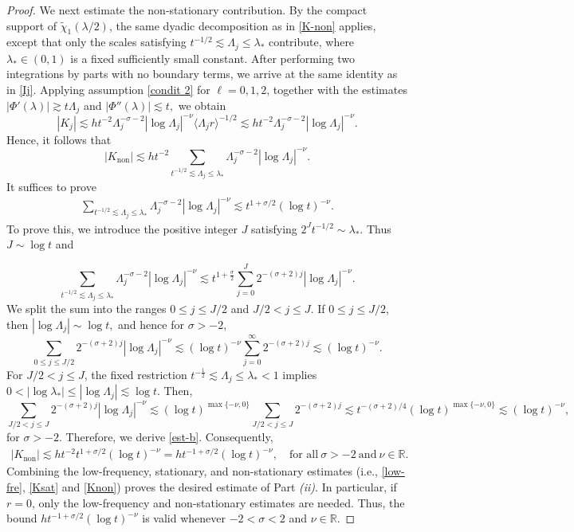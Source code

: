\documentclass[reqno]{amsart}
\numberwithin{equation}{section}
\begin{document}
\begin{proof}
	We next estimate the non-stationary contribution. By the compact
	support of $\widetilde{\chi}_1(\lambda/2)$, the same dyadic
	decomposition as in \eqref{K-non} applies, except that only the scales
	satisfying
	$
	t^{-1/2}
	\lesssim
	\Lambda_j
	\leq
	\lambda_*
	$
	contribute, where $\lambda_*\in(0,1)$ is a fixed sufficiently small
	constant. 	After performing two integrations by parts with no boundary terms, we arrive at the same identity as in \eqref{Ij}. Applying assumption \eqref{condit 2} for \(\ell=0,1,2\), together with the estimates
	$
	|\Phi'(\lambda)| \gtrsim t\Lambda_j
	$ and
	$|\Phi''(\lambda)| \lesssim t,
	$
	we obtain
	$$
	|K_j|
	\lesssim
	h t^{-2}
	\Lambda_j^{-\sigma-2}
	|\log\Lambda_j|^{-\nu}
	\langle\Lambda_j r\rangle^{-1/2}\lesssim
	h t^{-2}
	\Lambda_j^{-\sigma-2}
	|\log\Lambda_j|^{-\nu}.
	$$
	Hence,  it follows that
	$$
	|K_{\mathrm{non}}|
	\lesssim
	h t^{-2}
	\sum_{t^{-1/2}\lesssim\Lambda_j\le \lambda_*}
	\Lambda_j^{-\sigma-2}
	|\log\Lambda_j|^{-\nu}.
	$$
It suffices to prove 
	\begin{align}\label{est-b}
	\sum_{t^{-1/2}\lesssim\Lambda_j\le \lambda_*}
	\Lambda_j^{-\sigma-2}
	|\log\Lambda_j|^{-\nu}
	\lesssim
	t^{1+\sigma/2}
	(\log t)^{-\nu}.
	\end{align}
	To prove this, we introduce the positive integer $J$ satisfying
	 $
	2^Jt^{-1/2}\sim\lambda_*.
	$
	Thus
	$
	J\sim\log t
	$ and 

	$$
	\sum_{t^{-1/2}\lesssim\Lambda_j\le \lambda_*}
\Lambda_j^{-\sigma-2}
|\log\Lambda_j|^{-\nu}\lesssim	t^{1+\frac{\sigma}{2}}
	\sum_{j=0}^{J}
	2^{-(\sigma+2)j}
	\left|
	\log\Lambda_j
	\right|^{-\nu}.
	$$
	We split the sum into the ranges $0\leq j\leq J/2$ and
	$J/2<j\leq J$. If $0\leq j\leq J/2$, then
	$
	\left|
	\log\Lambda_j
	\right|
	\sim
	\log t,
	$
	and hence for $\sigma>-2$,
	$$
	\sum_{0\leq j\leq J/2}
	2^{-(\sigma+2)j}
	\left|
	\log\Lambda_j
	\right|^{-\nu}
	\lesssim
	(\log t)^{-\nu}
	\sum_{j=0}^\infty2^{-(\sigma+2)j}
	\lesssim
	(\log t)^{-\nu}.
	$$
	For $J/2<j\leq J$, the fixed restriction
	$
t^{-\frac{1}{2}}	\lesssim\Lambda_j\leq\lambda_*<1
	$
	implies
	$
0<	|\log\lambda_*|\leq	|\log\Lambda_j|
\lesssim\log t
.
	$
Then, 
	$$
	\sum_{J/2<j\leq J}
	2^{-(\sigma+2)j}
	\left|\log
\Lambda_j
	\right|^{-\nu}\lesssim
	(\log t)^{\max\{-\nu,0\}}\sum_{J/2<j\leq J}
	2^{-(\sigma+2)j}
	\lesssim
	t^{-(\sigma+2)/4}
	(\log t)^{\max\{-\nu,0\}}	\lesssim
	(\log t)^{-\nu},
	$$
	for $\sigma>-2$. Therefore,
	we derive \eqref{est-b}.
	Consequently,
	\begin{align}\label{Knon}
	|K_{\mathrm{non}}|
	\lesssim
	h t^{-2}
	t^{1+\sigma/2}
	(\log t)^{-\nu}
	=
	h t^{-1+\sigma/2}
	(\log t)^{-\nu},\quad \text{for all}\ \sigma>-2 \ \text{and}\ \nu\in\mathbb{R}.
	\end{align}
	Combining the low-frequency, stationary, and non-stationary estimates (i.e., \eqref{low-fre}, \eqref{Ksat} and \eqref{Knon})
	proves the desired  estimate  of Part \emph{(ii)}. In particular, 
	if \(r=0\), only the
	low-frequency and non-stationary estimates  are needed. Thus, the bound  $h t^{-1+\sigma/2}
		(\log t)^{-\nu}$ is valid whenever
	$
	-2<\sigma<2$ and $
	\nu\in\mathbb R.
	$
\end{proof}
\end{document}
